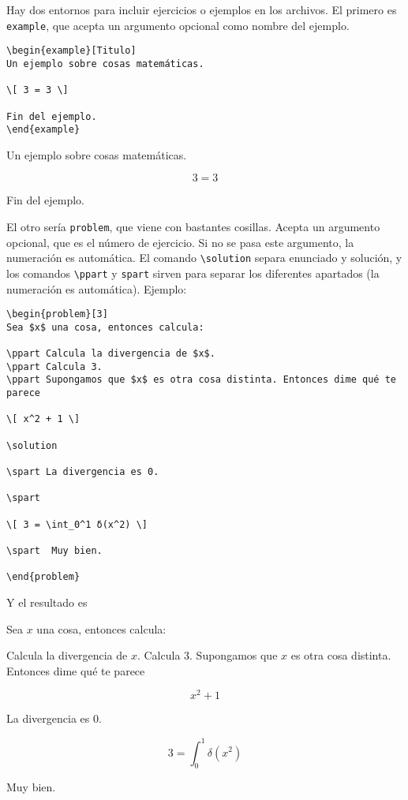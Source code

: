 \documentclass[nochap]{apuntes}
\begin{document}
Hay dos entornos para incluir ejercicios o ejemplos en los archivos. El primero es \texttt{example}, que acepta un argumento opcional como nombre del ejemplo.

\begin{verbatim}
\begin{example}[Titulo]
Un ejemplo sobre cosas matemáticas.

\[ 3 = 3 \]

Fin del ejemplo.
\end{example}
\end{verbatim}


\begin{example}[Titulo]
Un ejemplo sobre cosas matemáticas.

\[ 3 = 3 \]

Fin del ejemplo.
\end{example}

El otro sería \texttt{problem}, que viene con bastantes cosillas. Acepta un argumento opcional, que es el número de ejercicio. Si no se pasa este argumento, la numeración es automática. El comando \verb|\solution| separa enunciado y solución, y los comandos \verb|\ppart| y \verb|spart| sirven para separar los diferentes apartados (la numeración es automática). Ejemplo:

\begin{verbatim}
\begin{problem}[3]
Sea $x$ una cosa, entonces calcula:

\ppart Calcula la divergencia de $x$.
\ppart Calcula 3.
\ppart Supongamos que $x$ es otra cosa distinta. Entonces dime qué te parece

\[ x^2 + 1 \]

\solution

\spart La divergencia es 0.

\spart

\[ 3 = \int_0^1 δ(x^2) \]

\spart  Muy bien.

\end{problem}
\end{verbatim}
 
Y el resultado es 

\begin{problem}[3]
Sea $x$ una cosa, entonces calcula:

\ppart Calcula la divergencia de $x$.
\ppart Calcula 3.
\ppart Supongamos que $x$ es otra cosa distinta. Entonces dime qué te parece

\[ x^2 + 1 \]

\solution

\spart La divergencia es 0.

\spart

\[ 3 = \int_0^1 δ(x^2) \]

\spart  Muy bien.

\end{problem}
 
\end{document}

